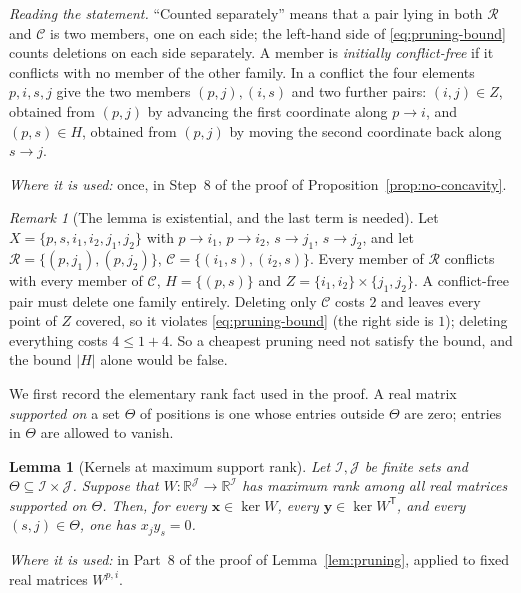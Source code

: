 \documentclass[11pt]{article}
\newtheorem{lemma}[theorem]{Lemma}
\theoremstyle{remark}
\newtheorem{remark}[theorem]{Remark}
\newcommand{\abs}[1]{\lvert #1\rvert}
\newcommand{\R}{\mathbb R}
\newcommand{\tp}{^{\mathsf T}}
\newcommand{\cR}{\mathcal R}
\newcommand{\cC}{\mathcal C}
\newcommand{\bx}{\mathbf x}
\newcommand{\by}{\mathbf y}
\begin{document}
\emph{Reading the statement.} ``Counted separately'' means that a pair lying
in both $\cR$ and $\cC$ is two members, one on each side; the left-hand side
of \eqref{eq:pruning-bound} counts deletions on each side separately.
A member is \emph{initially conflict-free} if it conflicts with no member of
the other family. In a conflict the four elements $p,i,s,j$ give the two
members $(p,j),(i,s)$ and two further pairs: $(i,j)\in Z$, obtained from
$(p,j)$ by advancing the first coordinate along $p\to i$, and
$(p,s)\in H$, obtained from $(p,j)$ by moving the second coordinate back
along $s\to j$.

\emph{Where it is used:} once, in Step~8 of the proof of
Proposition~\ref{prop:no-concavity}.

\begin{remark}[The lemma is existential, and the last term is needed]
Let $X=\{p,s,i_1,i_2,j_1,j_2\}$ with $p\to i_1$, $p\to i_2$, $s\to j_1$,
$s\to j_2$, and let $\cR=\{(p,j_1),(p,j_2)\}$,
$\cC=\{(i_1,s),(i_2,s)\}$. Every member of $\cR$ conflicts with every member
of $\cC$, $H=\{(p,s)\}$ and $Z=\{i_1,i_2\}\times\{j_1,j_2\}$. A conflict-free
pair must delete one family entirely. Deleting only $\cC$ costs $2$ and
leaves every point of $Z$ covered, so it violates \eqref{eq:pruning-bound}
(the right side is $1$); deleting everything costs $4\le 1+4$. So a
cheapest pruning need not satisfy the bound, and the bound $\abs H$ alone
would be false.
\end{remark}

We first record the elementary rank fact used in the proof. A real matrix
\emph{supported on} a set $\Theta$ of positions is one whose entries outside
$\Theta$ are zero; entries in $\Theta$ are allowed to vanish.

\begin{lemma}[Kernels at maximum support rank]\label{lem:kernel-support}
Let $\mathcal I,\mathcal J$ be finite sets and
$\Theta\subseteq\mathcal I\times\mathcal J$. Suppose that
$W:\R^{\mathcal J}\to\R^{\mathcal I}$ has maximum rank among all real
matrices supported on $\Theta$.
Then, for every $\bx\in\ker W$, every $\by\in\ker W\tp$, and every
$(s,j)\in\Theta$, one has $x_jy_s=0$.
\end{lemma}

\emph{Where it is used:} in Part~8 of the proof of
Lemma~\ref{lem:pruning}, applied to fixed real matrices $W^{p,i}$.
\end{document}
